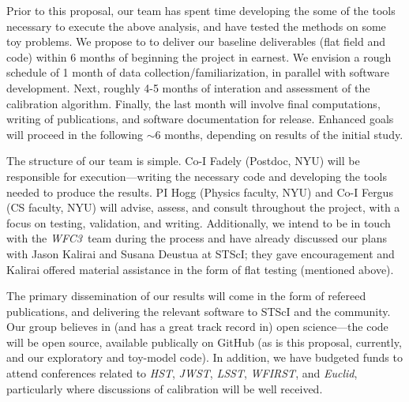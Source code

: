 \documentclass[12pt]{article}
\newcommand{\project}[1]{\textsl{#1}}
\newcommand{\HST}{\project{HST}}
\newcommand{\WFC}{\project{WFC3}}
\begin{document}
Prior to this proposal, our team has spent time developing the some of
the tools necessary to execute the above analysis, and have tested the
methods on some toy problems.  We propose to to deliver our baseline
deliverables (flat field and code) within 6 months of beginning the
project in earnest.  We envision a rough schedule of 1 month of data
collection/familiarization, in parallel with software development.
Next, roughly 4-5 months of interation and assessment of the
calibration algorithm.  Finally, the last month will involve final
computations, writing of publications, and software documentation for
release. Enhanced goals will proceed in the following $\sim6$ months,
depending on results of the initial study.

The structure of our team is simple.  Co-I Fadely (Postdoc, NYU) will
be responsible for execution---writing the necessary code and
developing the tools needed to produce the results.  PI Hogg (Physics
faculty, NYU) and Co-I Fergus (CS faculty, NYU) will advise, assess,
and consult throughout the project, with a focus on testing,
validation, and writing.  Additionally, we intend to be in touch with
the \WFC\ team during the process and have already discussed our plans
with Jason Kalirai and Susana Deustua at STScI; they gave
encouragement and Kalirai offered material assistance in the form of
flat testing (mentioned above).

The primary dissemination of our results will come in the form of
refereed publications, and delivering the relevant software to STScI
and the community.  Our group believes in (and has a great track
record in) open science---the code will be open source, available
publically on GitHub (as is this proposal, currently, and our
exploratory and toy-model code).  In addition, we have budgeted funds
to attend conferences related to \HST, \project{JWST}, \project{LSST},
\project{WFIRST}, and \project{Euclid}, particularly where discussions
of calibration will be well received.


%
%
%
\pasthstusage  %
\end{document}
